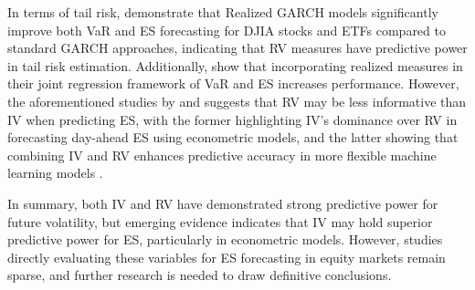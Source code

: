 In terms of tail risk, \textcite{Contino2017} demonstrate that Realized GARCH models significantly improve both VaR and ES forecasting for DJIA stocks and ETFs compared to standard GARCH approaches, indicating that RV measures have predictive power in tail risk estimation. Additionally, \textcite{chao2018} show that incorporating realized measures in their joint regression framework of VaR and ES increases performance. However, the aforementioned studies by \textcite{Lycsa2024} and \textcite{moen2024forecasting} suggests that RV may be less informative than IV when predicting ES, with the former highlighting IV’s dominance over RV in forecasting day-ahead ES using econometric models, and the latter showing that combining IV and RV enhances predictive accuracy in more flexible machine learning models . 

In summary, both IV and RV have demonstrated strong predictive power for future volatility, but emerging evidence indicates that IV may hold superior predictive power for ES, particularly in econometric models. However, studies directly evaluating these variables for ES forecasting in equity markets remain sparse, and further research is needed to draw definitive conclusions.

